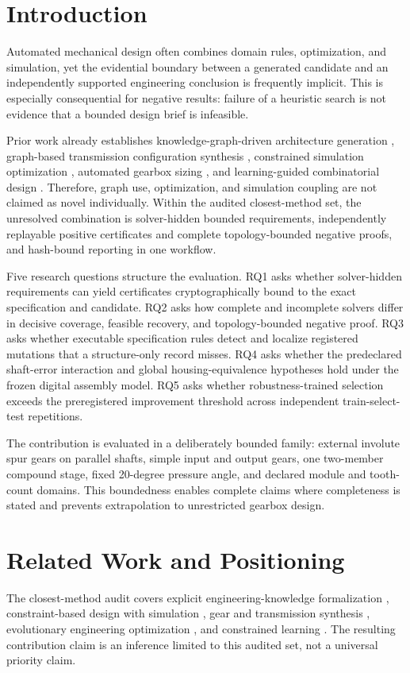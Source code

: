 \documentclass[preprint,12pt]{elsarticle}
\begin{document}
\section{Introduction}
Automated mechanical design often combines domain rules, optimization, and simulation, yet the evidential boundary between a generated candidate and an independently supported engineering conclusion is frequently implicit. This is especially consequential for negative results: failure of a heuristic search is not evidence that a bounded design brief is infeasible.

Prior work already establishes knowledge-graph-driven architecture generation \cite{huang-2025,sun-2026}, graph-based transmission configuration synthesis \cite{geng-2023}, constrained simulation optimization \cite{cicconi-2020}, automated gearbox sizing \cite{fuerst-2021}, and learning-guided combinatorial design \cite{lin-2023}. Therefore, graph use, optimization, and simulation coupling are not claimed as novel individually. Within the audited closest-method set, the unresolved combination is solver-hidden bounded requirements, independently replayable positive certificates and complete topology-bounded negative proofs, and hash-bound reporting in one workflow.

Five research questions structure the evaluation. RQ1 asks whether solver-hidden requirements can yield certificates cryptographically bound to the exact specification and candidate. RQ2 asks how complete and incomplete solvers differ in decisive coverage, feasible recovery, and topology-bounded negative proof. RQ3 asks whether executable specification rules detect and localize registered mutations that a structure-only record misses. RQ4 asks whether the predeclared shaft-error interaction and global housing-equivalence hypotheses hold under the frozen digital assembly model. RQ5 asks whether robustness-trained selection exceeds the preregistered improvement threshold across independent train-select-test repetitions.

The contribution is evaluated in a deliberately bounded family: external involute spur gears on parallel shafts, simple input and output gears, one two-member compound stage, fixed 20-degree pressure angle, and declared module and tooth-count domains. This boundedness enables complete claims where completeness is stated and prevents extrapolation to unrestricted gearbox design.

\section{Related Work and Positioning}
The closest-method audit covers explicit engineering-knowledge formalization \cite{hao-2021,bolognini-2022}, constraint-based design with simulation \cite{cicconi-2020}, gear and transmission synthesis \cite{fuerst-2021,geng-2023,kim-2026}, evolutionary engineering optimization \cite{fetanat-2023}, and constrained learning \cite{lin-2023}. The resulting contribution claim is an inference limited to this audited set, not a universal priority claim.
\end{document}
